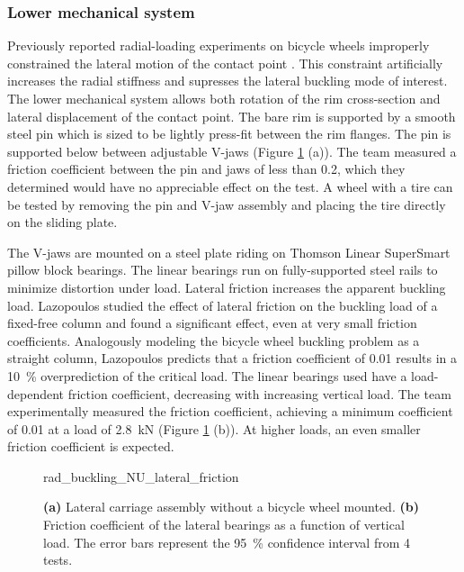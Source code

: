 \documentclass[\rootdir/thesis.tex]{subfiles}
\begin{document}
\subsubsection*{Lower mechanical system}

Previously reported radial-loading experiments on bicycle wheels improperly constrained the lateral motion of the contact point \cite{Burgoyne1993,RARblog,McLundie2007}. This constraint artificially increases the radial stiffness and supresses the lateral buckling mode of interest. The lower mechanical system allows both rotation of the rim cross-section and lateral displacement of the contact point. The bare rim is supported by a smooth steel pin which is sized to be lightly press-fit between the rim flanges. The pin is supported below between adjustable V-jaws (Figure \ref{fig:rad_buckling_NU_lateral_friction} (a)). The team measured a friction coefficient between the pin and jaws of less than 0.2, which they determined would have no appreciable effect on the test. A wheel with a tire can be tested by removing the pin and V-jaw assembly and placing the tire directly on the sliding plate.

The V-jaws are mounted on a steel plate riding on Thomson Linear SuperSmart pillow block bearings. The linear bearings run on fully-supported steel rails to minimize distortion under load. Lateral friction increases the apparent buckling load. Lazopoulos studied the effect of lateral friction on the buckling load of a fixed-free column \cite{Lazopoulos1991} and found a significant effect, even at very small friction coefficients. Analogously modeling the bicycle wheel buckling problem as a straight column, Lazopoulos predicts that a friction coefficient of 0.01 results in a \SI{10}{\percent} overprediction of the critical load. The linear bearings used have a load-dependent friction coefficient, decreasing with increasing vertical load. The team experimentally measured the friction coefficient, achieving a minimum coefficient of 0.01 at a load of \SI{2.8}{\kilo\newton} (Figure \ref{fig:rad_buckling_NU_lateral_friction} (b)). At higher loads, an even smaller friction coefficient is expected.

\begin{figure}[t]
\centering
{rad_buckling_NU_lateral_friction}
\caption{\textbf{(a)} Lateral carriage assembly without a bicycle wheel mounted. \textbf{(b)} Friction coefficient of the lateral bearings as a function of vertical load. The error bars represent the \SI{95}{\percent} confidence interval from 4 tests.}
\label{fig:rad_buckling_NU_lateral_friction}
\end{figure}
\end{document}
